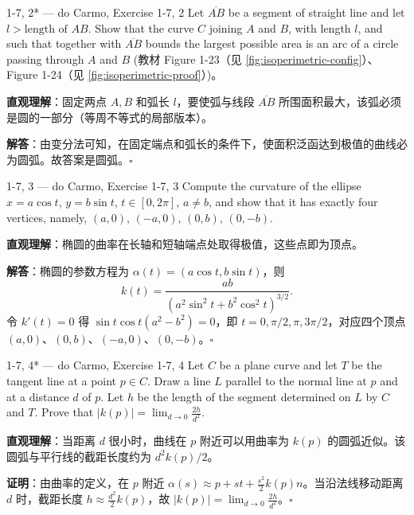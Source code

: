 \begin{exercise}{1-7, 2* — do Carmo, Exercise 1-7, 2}
Let $\overline{AB}$ be a segment of straight line and let $l > \text{length of } AB$. Show that the curve $C$ joining $A$ and $B$, with length $l$, and such that together with $\overline{AB}$ bounds the largest possible area is an arc of a circle passing through $A$ and $B$ (教材 Figure 1-23（见 \cref{fig:isoperimetric-config}）、Figure 1-24（见 \cref{fig:isoperimetric-proof}）)。
\end{exercise}

\begin{solution}
\textbf{直观理解}：固定两点 $A,B$ 和弧长 $l$，要使弧与线段 $\overline{AB}$ 所围面积最大，该弧必须是圆的一部分（等周不等式的局部版本）。

\textbf{解答}：由变分法可知，在固定端点和弧长的条件下，使面积泛函达到极值的曲线必为圆弧。故答案是圆弧。$\square$
\end{solution}

\begin{exercise}{1-7, 3 — do Carmo, Exercise 1-7, 3}
Compute the curvature of the ellipse $x = a\cos t$, $y = b\sin t$, $t \in [0, 2\pi]$, $a \neq b$, and show that it has exactly four vertices, namely, $(a, 0)$, $(-a, 0)$, $(0, b)$, $(0, -b)$.
\end{exercise}

\begin{solution}
\textbf{直观理解}：椭圆的曲率在长轴和短轴端点处取得极值，这些点即为顶点。

\textbf{解答}：椭圆的参数方程为 $\alpha(t) = (a\cos t, b\sin t)$，则
\[
k(t) = \frac{ab}{(a^2\sin^2 t + b^2\cos^2 t)^{3/2}}.
\]
令 $k'(t) = 0$ 得 $\sin t\cos t(a^2-b^2) = 0$，即 $t = 0, \pi/2, \pi, 3\pi/2$，对应四个顶点 $(a,0)$、$(0,b)$、$(-a,0)$、$(0,-b)$。$\square$
\end{solution}

\begin{exercise}{1-7, 4* — do Carmo, Exercise 1-7, 4}
Let $C$ be a plane curve and let $T$ be the tangent line at a point $p \in C$. Draw a line $L$ parallel to the normal line at $p$ and at a distance $d$ of $p$. Let $h$ be the length of the segment determined on $L$ by $C$ and $T$. Prove that $|k(p)| = \lim_{d \to 0} \frac{2h}{d^2}$.
\end{exercise}

\begin{solution}
\textbf{直观理解}：当距离 $d$ 很小时，曲线在 $p$ 附近可以用曲率为 $k(p)$ 的圆弧近似。该圆弧与平行线的截距长度约为 $d^2 k(p)/2$。

\textbf{证明}：由曲率的定义，在 $p$ 附近 $\alpha(s) \approx p + s t + \frac{s^2}{2}k(p)n$。当沿法线移动距离 $d$ 时，截距长度 $h \approx \frac{d^2}{2}k(p)$，故 $|k(p)| = \lim_{d\to 0}\frac{2h}{d^2}$。$\square$
\end{solution}

